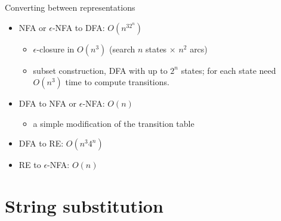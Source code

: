 \documentclass[handout]{beamer}
\begin{document}
\begin{frame}{Converting between representations}

    \begin{center}
    \end{center}
        
    \begin{itemize}
        \item NFA or $\epsilon$-NFA to DFA: $O(n^32^n)$
        \begin{itemize}
            \item $\epsilon$-closure in $O(n^3)$ (search $n$ states $\times$ $n^2$ arcs)
            \item subset construction, DFA with up to $2^n$ states; for each state need $O(n^3)$ time to compute transitions.
        \end{itemize}        
        \item DFA to NFA or $\epsilon$-NFA: $O(n)$
        \begin{itemize}
            \item a simple modification of the transition table
        \end{itemize}        
        \item DFA to RE:  $O(n^3 4^n)$        
        \item RE to $\epsilon$-NFA: $O(n)$        
    \end{itemize}

\end{frame}


\section*{String substitution}
\end{document}
